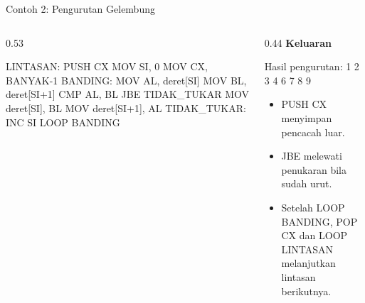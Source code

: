 \documentclass[aspectratio=169,11pt]{beamer}
\begin{document}
\begin{frame}[fragile]{Contoh 2: Pengurutan Gelembung}
\begin{columns}[t]
\begin{column}{0.53\textwidth}
\begin{kodeasm}
LINTASAN:
    PUSH CX
    MOV SI, 0
    MOV CX, BANYAK-1
BANDING:
    MOV AL, deret[SI]
    MOV BL, deret[SI+1]
    CMP AL, BL
    JBE TIDAK_TUKAR
    MOV deret[SI], BL
    MOV deret[SI+1], AL
TIDAK_TUKAR:
    INC SI
    LOOP BANDING
\end{kodeasm}
\end{column}
\begin{column}{0.44\textwidth}
\footnotesize
{\color{obeTeal}\bfseries Keluaran}\\[0.15em]
\begin{keluaran}
Hasil pengurutan: 1 2 3 4 6 7 8 9
\end{keluaran}

\vspace{0.3em}
\begin{itemize}
    \item PUSH CX menyimpan pencacah luar.
    \item JBE melewati penukaran bila sudah urut.
    \item Setelah LOOP BANDING, POP CX dan LOOP LINTASAN
          melanjutkan lintasan berikutnya.
\end{itemize}
\end{column}
\end{columns}
\end{frame}
\end{document}
